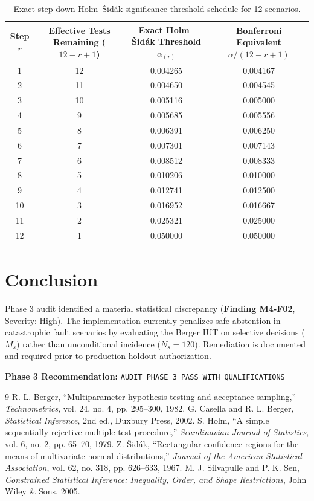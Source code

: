 \documentclass[10pt,a4paper]{article}
\begin{document}
\begin{table}[h!]
\centering
\small
\begin{tabularx}{\textwidth}{cccc}
\toprule
\textbf{Step} $r$ & \textbf{Effective Tests Remaining} ($12 - r + 1$) & \textbf{Exact Holm--Šidák Threshold} $\alpha_{(r)}$ & \textbf{Bonferroni Equivalent} $\alpha / (12 - r + 1)$ \\
\midrule
1 & 12 & 0.004265 & 0.004167 \\
2 & 11 & 0.004650 & 0.004545 \\
3 & 10 & 0.005116 & 0.005000 \\
4 & 9 & 0.005685 & 0.005556 \\
5 & 8 & 0.006391 & 0.006250 \\
6 & 7 & 0.007301 & 0.007143 \\
7 & 6 & 0.008512 & 0.008333 \\
8 & 5 & 0.010206 & 0.010000 \\
9 & 4 & 0.012741 & 0.012500 \\
10 & 3 & 0.016952 & 0.016667 \\
11 & 2 & 0.025321 & 0.025000 \\
12 & 1 & 0.050000 & 0.050000 \\
\bottomrule
\end{tabularx}
\caption{Exact step-down Holm--Šidák significance threshold schedule for 12 scenarios.}
\label{tab:holm_thresholds}
\end{table}

\section{Conclusion}
Phase 3 audit identified a material statistical discrepancy (\textbf{Finding M4-F02}, Severity: High). The implementation currently penalizes safe abstention in catastrophic fault scenarios by evaluating the Berger IUT on selective decisions ($M_s$) rather than unconditional incidence ($N_s = 120$). Remediation is documented and required prior to production holdout authorization.

\noindent \textbf{Phase 3 Recommendation:} \texttt{AUDIT\_PHASE\_3\_PASS\_WITH\_QUALIFICATIONS}

\begin{thebibliography}{9}
 R. L. Berger, ``Multiparameter hypothesis testing and acceptance sampling,'' \textit{Technometrics}, vol. 24, no. 4, pp. 295--300, 1982.
 G. Casella and R. L. Berger, \textit{Statistical Inference}, 2nd ed., Duxbury Press, 2002.
 S. Holm, ``A simple sequentially rejective multiple test procedure,'' \textit{Scandinavian Journal of Statistics}, vol. 6, no. 2, pp. 65--70, 1979.
 Z. Šidák, ``Rectangular confidence regions for the means of multivariate normal distributions,'' \textit{Journal of the American Statistical Association}, vol. 62, no. 318, pp. 626--633, 1967.
 M. J. Silvapulle and P. K. Sen, \textit{Constrained Statistical Inference: Inequality, Order, and Shape Restrictions}, John Wiley \& Sons, 2005.
\end{thebibliography}
\end{document}
